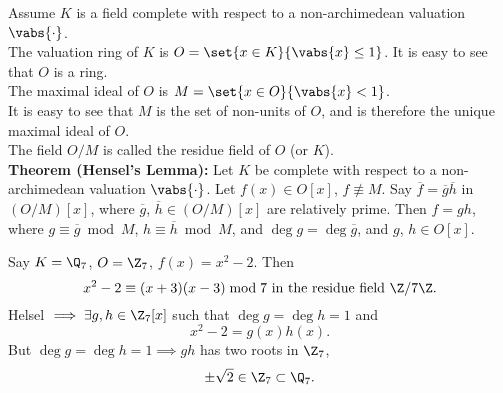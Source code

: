 Assume $K$ is a field complete with respect to a non-archimedean valuation $\vabs{\cdot}$. \\
 The valuation ring of $K$ is $O=\set{x\in K}{\vabs{x}\leq1}$.  It is easy to see that $O$ is a ring. \\
 The maximal ideal of $O$ is $M=\set{x\in O}{\vabs{x}<1}$. \\
It is easy to see that $M$ is the set of non-units of $O$, and is therefore the unique maximal ideal of $O$. \\
 The field $O/M$ is called the residue field of $O$ (or $K$). \\
\textbf{Theorem (Hensel's Lemma): }Let $K$ be complete with respect to a non-archimedean valuation $\vabs{\cdot}$.
Let $f(x)\in O[x]$, $f\nequiv M$.  Say $\overline f=\overline g\overline h$ in $(O/M)[x]$, where $\overline g$, $\overline h\in(O/M)[x]$ are relatively prime.  Then $f=gh$, where $g\equiv\overline g\bmod M$, $h\equiv\overline h\bmod M$, and $\deg g=\deg\overline g$, and $g$, $h\in O[x]$.

\eg Say $K=\Q_7$, $O=\Z_7$, $f(x)=x^2-2$.  Then
\[ x^2-2 \equiv (x+3)(x-3) \bmod 7 \text{ in the residue field $\Z/7\Z$} . \]
Helsel $\implies\exists g,h\in\Z_7[x]$ such that $\deg g=\deg h=1$ and
\[ x^2-2=g(x)h(x) . \]
But $\deg g=\deg h=1\implies gh$ has two roots in $\Z_7$,
\[ \pm\sqrt2 \in \Z_7 \subset \Q_7 . \]
